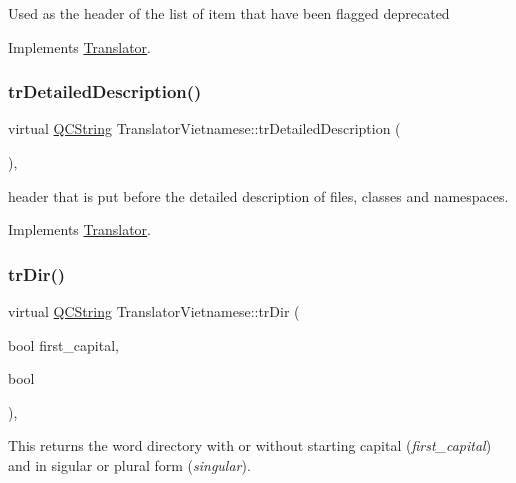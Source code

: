 Used as the header of the list of item that have been flagged deprecated 

Implements \mbox{\hyperlink{class_translator}{Translator}}.

\mbox{\label{class_translator_vietnamese_a93069f1bc56d8eedc4e527b552603ab4}} 
\subsubsection{\texorpdfstring{trDetailedDescription()}{trDetailedDescription()}}
{\footnotesize\ttfamily virtual \mbox{\hyperlink{class_q_c_string}{Q\+C\+String}} Translator\+Vietnamese\+::tr\+Detailed\+Description (\begin{DoxyParamCaption}{ }\end{DoxyParamCaption})\hspace{0.3cm}{\ttfamily [inline]}, {\ttfamily [virtual]}}

header that is put before the detailed description of files, classes and namespaces. 

Implements \mbox{\hyperlink{class_translator}{Translator}}.

\mbox{\label{class_translator_vietnamese_ac229e326629a65442b5acc0462e78464}} 
\subsubsection{\texorpdfstring{trDir()}{trDir()}}
{\footnotesize\ttfamily virtual \mbox{\hyperlink{class_q_c_string}{Q\+C\+String}} Translator\+Vietnamese\+::tr\+Dir (\begin{DoxyParamCaption}\item[{bool}]{first\+\_\+capital,  }\item[{bool}]{ }\end{DoxyParamCaption})\hspace{0.3cm}{\ttfamily [inline]}, {\ttfamily [virtual]}}

This returns the word directory with or without starting capital ({\itshape first\+\_\+capital}) and in sigular or plural form ({\itshape singular}). 

